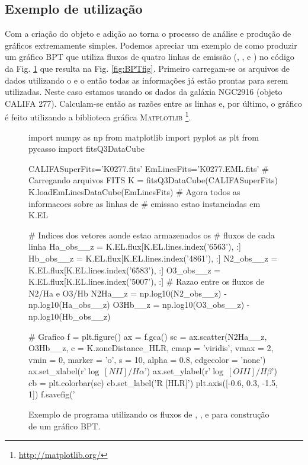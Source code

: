 \subsection{Exemplo de utilização}
\label{sec:emline:datacube:exemple}

Com a criação do objeto \emldc e adição ao \pycasso torna o processo de análise e produção de
gráficos extremamente simples. Podemos apreciar um exemplo de como produzir um gráfico BPT
\citep{Baldwin.Phillips.Terlevich.1981a} que utiliza fluxos de quatro linhas de emissão (\Halpha,
\Hbeta, \OIII e \NII) no código da Fig. \ref{fig:BPTprog} que resulta na Fig. \ref{fig:BPTfig}.
Primeiro carregam-se os arquivos de dados utilizando o \pycasso e o \emldc então todas as
informações já estão prontas para serem utilizadas. Neste caso estamos usando os dados da galáxia
NGC2916 (objeto CALIFA 277). Calculam-se então as razões entre as linhas e, por último, o gráfico é
feito utilizando a biblioteca gráfica M\textsc{atplotlib} \footnote{
	\href{http://matplotlib.org/}{http://matplotlib.org/}
}.

\begin{figure}
	\begin{python}
import numpy as np
from matplotlib import pyplot as plt
from pycasso import fitsQ3DataCube

CALIFASuperFits='K0277.fits'
EmLinesFits='K0277.EML.fits'
# Carregando arquivos FITS
K = fitsQ3DataCube(CALIFASuperFits)
K.loadEmLinesDataCube(EmLinesFits)
# Agora todos as informacoes sobre as linhas de
# emissao estao instanciadas em K.EL

# Indices dos vetores aonde estao armazenados os
# fluxos de cada linha
Ha_obs__z = K.EL.flux[K.EL.lines.index('6563'), :]
Hb_obs__z = K.EL.flux[K.EL.lines.index('4861'), :]
N2_obs__z = K.EL.flux[K.EL.lines.index('6583'), :]
O3_obs__z = K.EL.flux[K.EL.lines.index('5007'), :]
# Razao entre os fluxos de N2/Ha e O3/Hb
N2Ha__z = np.log10(N2_obs__z) - np.log10(Ha_obs__z)
O3Hb__z = np.log10(O3_obs__z) - np.log10(Hb_obs__z)

# Grafico
f = plt.figure()
ax = f.gca()
sc = ax.scatter(N2Ha__z, O3Hb__z, c = K.zoneDistance_HLR,
           cmap = 'viridis', vmax = 2, vmin = 0,
           marker = 'o', s = 10, alpha = 0.8, edgecolor = 'none')
ax.set_xlabel(r'$\log\ [NII]/H\alpha$')
ax.set_ylabel(r'$\log\ [OIII]/H\beta$')
cb = plt.colorbar(sc)
cb.set_label('R [HLR]')
plt.axis([-0.6, 0.3, -1.5, 1])
f.savefig('%
	\end{python}
	\caption[Exemplo de programa utilizando o EmLinesDataCube.]
	{Exemplo de programa utilizando os fluxos de \Halpha, \Hbeta, \OIII e \NII 
	para construção de um gráfico BPT.}
	\label{fig:BPTprog}
\end{figure}

